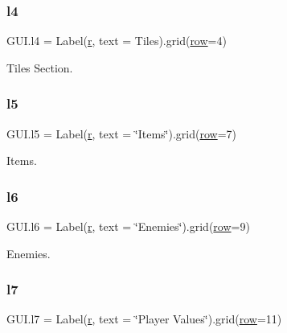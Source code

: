 \mbox{\label{namespace_g_u_i_ac505e29343a8c79d7347a8be5c4fffa5}} 
\subsubsection{\texorpdfstring{l4}{l4}}
{\footnotesize\ttfamily G\+U\+I.\+l4 = Label(\mbox{\hyperlink{_s_d_l__opengl_8h_a42ce7cdc612e53abee15043f80220d97}{r}}, text = \textquotesingle{}Tiles\textquotesingle{}).grid(\mbox{\hyperlink{_s_d_l__opengl__glext_8h_a90d3e7e4182a9630993f640fa0443b0b}{row}}=4)}



Tiles Section. 

\mbox{\label{namespace_g_u_i_af4d553e4d64242f914c988b9b5cb6c88}} 
\subsubsection{\texorpdfstring{l5}{l5}}
{\footnotesize\ttfamily G\+U\+I.\+l5 = Label(\mbox{\hyperlink{_s_d_l__opengl_8h_a42ce7cdc612e53abee15043f80220d97}{r}}, text = \char`\"{}Items\char`\"{}).grid(\mbox{\hyperlink{_s_d_l__opengl__glext_8h_a90d3e7e4182a9630993f640fa0443b0b}{row}}=7)}



Items. 

\mbox{\label{namespace_g_u_i_a030836603e07318a291bb6c3ad25ff3f}} 
\subsubsection{\texorpdfstring{l6}{l6}}
{\footnotesize\ttfamily G\+U\+I.\+l6 = Label(\mbox{\hyperlink{_s_d_l__opengl_8h_a42ce7cdc612e53abee15043f80220d97}{r}}, text = \char`\"{}Enemies\char`\"{}).grid(\mbox{\hyperlink{_s_d_l__opengl__glext_8h_a90d3e7e4182a9630993f640fa0443b0b}{row}}=9)}



Enemies. 

\mbox{\label{namespace_g_u_i_a3e7474bdd0fb176960a855522043a291}} 
\subsubsection{\texorpdfstring{l7}{l7}}
{\footnotesize\ttfamily G\+U\+I.\+l7 = Label(\mbox{\hyperlink{_s_d_l__opengl_8h_a42ce7cdc612e53abee15043f80220d97}{r}}, text = \char`\"{}Player Values\char`\"{}).grid(\mbox{\hyperlink{_s_d_l__opengl__glext_8h_a90d3e7e4182a9630993f640fa0443b0b}{row}}=11)}



